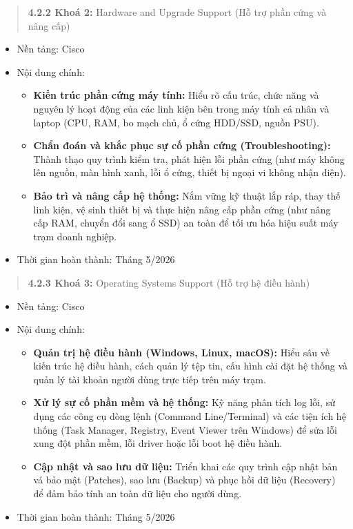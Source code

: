 \documentclass[
]{article}
\begin{document}
\begin{quote}
\textbf{4.2.2 Khoá 2:} Hardware and Upgrade Support (Hỗ trợ phần cứng và
nâng cấp)
\end{quote}

\begin{itemize}
\item
  Nền tảng: Cisco
\item
  Nội dung chính:

  \begin{itemize}
  \item
    \textbf{Kiến trúc phần cứng máy tính:} Hiểu rõ cấu trúc, chức năng
    và nguyên lý hoạt động của các linh kiện bên trong máy tính cá nhân
    và laptop (CPU, RAM, bo mạch chủ, ổ cứng HDD/SSD, nguồn PSU).
  \item
    \textbf{Chẩn đoán và khắc phục sự cố phần cứng (Troubleshooting):}
    Thành thạo quy trình kiểm tra, phát hiện lỗi phần cứng (như máy
    không lên nguồn, màn hình xanh, lỗi ổ cứng, thiết bị ngoại vi không
    nhận diện).
  \item
    \textbf{Bảo trì và nâng cấp hệ thống:} Nắm vững kỹ thuật lắp ráp,
    thay thế linh kiện, vệ sinh thiết bị và thực hiện nâng cấp phần cứng
    (như nâng cấp RAM, chuyển đổi sang ổ SSD) an toàn để tối ưu hóa hiệu
    suất máy trạm doanh nghiệp.
  \end{itemize}
\item
  Thời gian hoàn thành: Tháng 5/2026
\end{itemize}

\begin{quote}
\textbf{4.2.3 Khoá 3:} Operating Systems Support (Hỗ trợ hệ điều hành)
\end{quote}

\begin{itemize}
\item
  Nền tảng: Cisco
\item
  Nội dung chính:

  \begin{itemize}
  \item
    \textbf{Quản trị hệ điều hành (Windows, Linux, macOS):} Hiểu sâu về
    kiến trúc hệ điều hành, cách quản lý tệp tin, cấu hình cài đặt hệ
    thống và quản lý tài khoản người dùng trực tiếp trên máy trạm.
  \item
    \textbf{Xử lý sự cố phần mềm và hệ thống:} Kỹ năng phân tích log
    lỗi, sử dụng các công cụ dòng lệnh (Command Line/Terminal) và các
    tiện ích hệ thống (Task Manager, Registry, Event Viewer trên
    Windows) để sửa lỗi xung đột phần mềm, lỗi driver hoặc lỗi boot hệ
    điều hành.
  \item
    \textbf{Cập nhật và sao lưu dữ liệu:} Triển khai các quy trình cập
    nhật bản vá bảo mật (Patches), sao lưu (Backup) và phục hồi dữ liệu
    (Recovery) để đảm bảo tính an toàn dữ liệu cho người dùng.
  \end{itemize}
\item
  Thời gian hoàn thành: Tháng 5/2026
\end{itemize}
\end{document}
